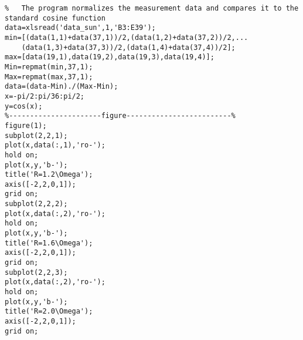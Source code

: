 \begin{appendix}
\begin{spacing}{1.5}
\vspace{-4ex}
\begin{lstlisting}
%   The program normalizes the measurement data and compares it to the standard cosine function
data=xlsread('data_sun',1,'B3:E39');
min=[(data(1,1)+data(37,1))/2,(data(1,2)+data(37,2))/2,...
    (data(1,3)+data(37,3))/2,(data(1,4)+data(37,4))/2];
max=[data(19,1),data(19,2),data(19,3),data(19,4)];
Min=repmat(min,37,1);
Max=repmat(max,37,1);
data=(data-Min)./(Max-Min);
x=-pi/2:pi/36:pi/2;
y=cos(x);
%----------------------figure-------------------------%
figure(1);
subplot(2,2,1);
plot(x,data(:,1),'ro-');
hold on;
plot(x,y,'b-');
title('R=1.2\Omega');
axis([-2,2,0,1]);
grid on;
subplot(2,2,2);
plot(x,data(:,2),'ro-');
hold on;
plot(x,y,'b-');
title('R=1.6\Omega');
axis([-2,2,0,1]);
grid on;
subplot(2,2,3);
plot(x,data(:,2),'ro-');
hold on;
plot(x,y,'b-');
title('R=2.0\Omega');
axis([-2,2,0,1]);
grid on;
\end{lstlisting}
\end{spacing}

\end{appendix}
